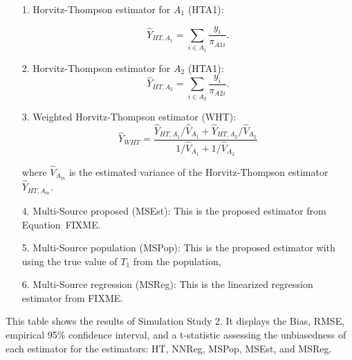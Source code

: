 \documentclass[12pt]{article}
\begin{document}
\begin{itemize}
  \item[1.] Horvitz-Thompson estimator for $A_1$ (HTA1):

    $$\hat Y_{HT, A_1} = \sum_{i \in A_1} \frac{y_i}{\pi_{A1i}}.$$
  \item[2.] Horvitz-Thompson estimator for $A_2$ (HTA1):
    $$\hat Y_{HT, A_2} = \sum_{i \in A_2} \frac{y_i}{\pi_{A2i}}.$$
  \item[3.] Weighted Horvitz-Thompson estimator (WHT):
    $$\hat Y_{WHT} = \frac{\hat Y_{HT, A_1} / \hat V_{A_1} + \hat Y_{HT, A_2} /
    \hat V_{A_2}}{1 / \hat V_{A_1} + 1 / \hat V_{A_2}}$$

    where $\hat V_{A_m}$ is the estimated variance of the Horvitz-Thompson
    estimator $\hat Y_{HT, A_m}$.
  \item[4.] Multi-Source proposed (MSEst): This is the proposed estimator from
    Equation~FIXME.
  \item[5.] Multi-Source population (MSPop): This is the proposed estimator with
    using the true value of $T_1$ from the population,
  \item[6.] Multi-Source regression (MSReg): This is the linearized regression
    estimator from FIXME.
\end{itemize}

\begin{table}[ht!]
  \centering
  
\caption{This table shows the results of Simulation Study 2. It displays the
Bias, RMSE, empirical 95\% confidence interval, and a t-statistic assessing the
unbiasedness of each estimator for the estimators: HT, NNReg, MSPop, MSEst, and
MSReg.}
\label{tab:msdc2-mean}
\end{table}


\newpage 



\end{document}
